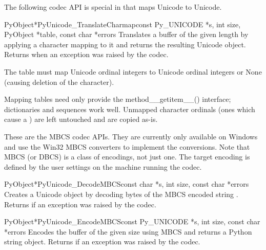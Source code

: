 The following codec API is special in that maps Unicode to Unicode.

\begin{cfuncdesc}{PyObject*}{PyUnicode_TranslateCharmap}{const Py_UNICODE *s,
                                               int size,
                                               PyObject *table,
                                               const char *errors}
  Translates a  buffer of the given length by
  applying a character mapping  to it and returns the
  resulting Unicode object.  Returns \NULL{} when an exception was
  raised by the codec.

  The  table must map Unicode ordinal integers to Unicode
  ordinal integers or None (causing deletion of the character).

  Mapping tables need only provide the method{__getitem__()}
  interface; dictionaries and sequences work well.  Unmapped character
  ordinals (ones which cause a ) are left
  untouched and are copied as-is.
\end{cfuncdesc}


These are the MBCS codec APIs. They are currently only available on
Windows and use the Win32 MBCS converters to implement the
conversions.  Note that MBCS (or DBCS) is a class of encodings, not
just one.  The target encoding is defined by the user settings on the
machine running the codec.

\begin{cfuncdesc}{PyObject*}{PyUnicode_DecodeMBCS}{const char *s,
                                               int size,
                                               const char *errors}
  Creates a Unicode object by decoding  bytes of the MBCS
  encoded string .  Returns \NULL{} if an exception was
  raised by the codec.
\end{cfuncdesc}

\begin{cfuncdesc}{PyObject*}{PyUnicode_EncodeMBCS}{const Py_UNICODE *s,
                                               int size,
                                               const char *errors}
  Encodes the  buffer of the given size using MBCS
  and returns a Python string object.  Returns \NULL{} if an exception
  was raised by the codec.
\end{cfuncdesc}

